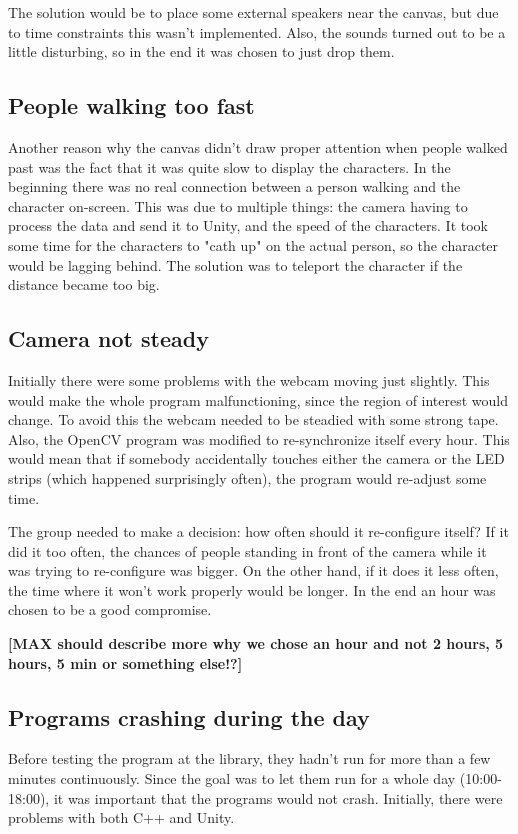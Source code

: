 The solution would be to place some external speakers near the canvas, but due to time constraints this wasn't implemented. Also, the sounds turned out to be a little disturbing, so in the end it was chosen to just drop them.

\subsection{People walking too fast}
Another reason why the canvas didn't draw proper attention when people walked past was the fact that it was quite slow to display the characters. In the beginning there was no real connection between a person walking and the character on-screen. This was due to multiple things: the camera having to process the data and send it to Unity, and the speed of the characters. It took some time for the characters to "cath up" on the actual person, so the character would be lagging behind. The solution was to teleport the character if the distance became too big.

\subsection{Camera not steady}
Initially there were some problems with the webcam moving just slightly. This would make the whole program malfunctioning, since the region of interest would change. To avoid this the webcam needed to be steadied with some strong tape. Also, the OpenCV program was modified to re-synchronize itself every hour. This would mean that if somebody accidentally touches either the camera or the LED strips (which happened surprisingly often), the program would re-adjust some time.

The group needed to make a decision: how often should it re-configure itself? If it did it too often, the chances of people standing in front of the camera while it was trying to re-configure was bigger. On the other hand, if it does it less often, the time where it won't work properly would be longer. In the end an hour was chosen to be a good compromise.

\textbf{[MAX should describe more why we chose an hour and not 2 hours, 5 hours, 5 min or something else!?]}

\subsection{Programs crashing during the day}
Before testing the program at the library, they hadn't run for more than a few minutes continuously. Since the goal was to let them run for a whole day (10:00-18:00), it was important that the programs would not crash. Initially, there were problems with both C++ and Unity.


